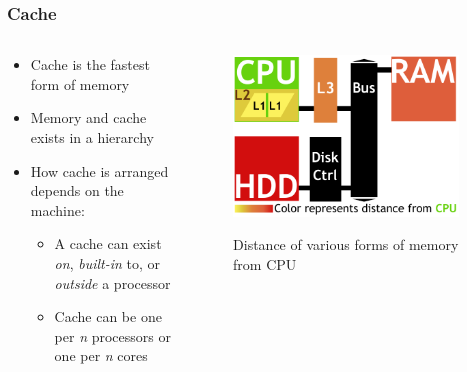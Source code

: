 \documentclass{beamer}
\begin{document}
\begin{frame}
\frametitle{Cache}

\begin{columns}
\begin{column}{0.5\textwidth}
\begin{itemize}
	\item Cache is the fastest form of memory
	\item Memory and cache exists in a hierarchy %
	\item How cache is arranged depends on the machine:
	\begin{itemize}
		\item A cache can exist \emph{on}, \emph{built-in} to, or \emph{outside} a processor
		\item Cache can be one per \emph{n} processors or one per \emph{n} cores
	
	
	\end{itemize}
\end{itemize}

\end{column}
\begin{column}{0.5\textwidth}
		\begin{figure}
		\includegraphics[width=0.95\textwidth]{Illustrations/CacheAbstract}
		\label{fig:domains}
		\caption{Distance of various forms of memory from CPU}
		\end{figure}
	\end{column}
\end{columns}
\end{frame}
\end{document}
